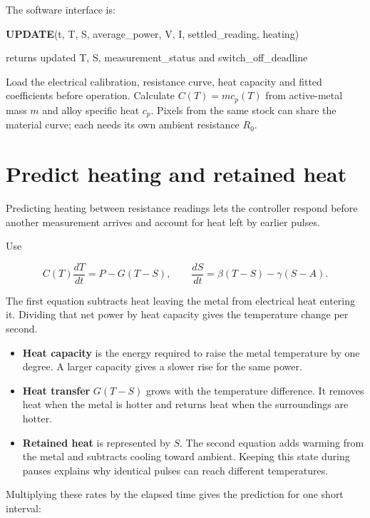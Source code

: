 \documentclass[11pt,letterpaper]{article}
\newenvironment{pseudocode}{\par\begingroup\small\setlength{\parskip}{0.15em}}{\endgroup\par}
\newcommand{\pcstep}[2]{\par\noindent\hspace*{#1em}\parbox[t]{\dimexpr\linewidth-#1em\relax}{\raggedright #2\strut}}
\begin{document}
The software interface is:

\begin{pseudocode}
\pcstep{0.0}{\textbf{UPDATE}(t, T, S, average\_\allowbreak{}power, V, I, settled\_\allowbreak{}reading, heating)}
\pcstep{1.0}{returns updated T, S, measurement\_\allowbreak{}status and switch\_\allowbreak{}off\_\allowbreak{}deadline}
\end{pseudocode}

Load the electrical calibration, resistance curve, heat capacity and fitted coefficients before operation. Calculate \(C(T)=m c_p(T)\) from active-metal mass \(m\) and alloy specific heat \(c_p\). Pixels from the same stock can share the material curve; each needs its own ambient resistance \(R_0\).

\section{Predict heating and retained heat}

Predicting heating between resistance readings lets the controller respond before another measurement arrives and account for heat left by earlier pulses.

Use

\[
C(T)\frac{dT}{dt}=P-G(T-S),\qquad
\frac{dS}{dt}=\beta(T-S)-\gamma(S-A).
\]

The first equation subtracts heat leaving the metal from electrical heat entering it. Dividing that net power by heat capacity gives the temperature change per second.

\begin{itemize}
\item \textbf{Heat capacity} is the energy required to raise the metal temperature by one degree. A larger capacity gives a slower rise for the same power.
\item \textbf{Heat transfer} \(G(T-S)\) grows with the temperature difference. It removes heat when the metal is hotter and returns heat when the surroundings are hotter.
\item \textbf{Retained heat} is represented by \(S\). The second equation adds warming from the metal and subtracts cooling toward ambient. Keeping this state during pauses explains why identical pulses can reach different temperatures.
\end{itemize}

Multiplying these rates by the elapsed time gives the prediction for one short interval:
\end{document}
